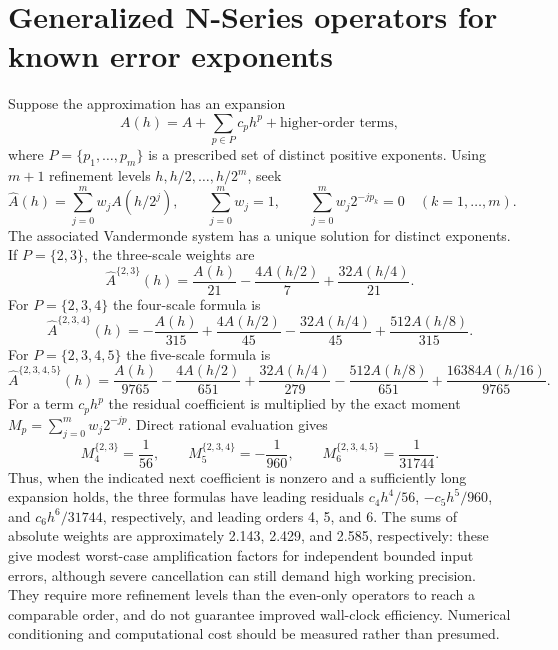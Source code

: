 \documentclass[11pt]{article}
\theoremstyle{remark}
\newcommand{\Ahat}{\widehat{A}}
\begin{document}
\section{Generalized N-Series operators for known error exponents}
Suppose the approximation has an expansion
\[
A(h)=A+\sum_{p\in P}c_ph^p+\text{higher-order terms},
\]
where $P=\{p_1,\dots,p_m\}$ is a prescribed set of distinct positive exponents. Using $m+1$
refinement levels $h,h/2,\dots,h/2^m$, seek
\begin{equation}\label{eq:gen}
\Ahat(h)=\sum_{j=0}^{m}w_jA(h/2^j),\qquad
\sum_{j=0}^{m}w_j=1,\qquad
\sum_{j=0}^{m}w_j2^{-jp_k}=0\quad(k=1,\dots,m).
\end{equation}
The associated Vandermonde system has a unique solution for distinct exponents. If
$P=\{2,3\}$, the three-scale weights are
\begin{equation}\label{eq:P23}
\Ahat^{\{2,3\}}(h)=\frac{A(h)}{21}-\frac{4A(h/2)}{7}+\frac{32A(h/4)}{21}.
\end{equation}
For $P=\{2,3,4\}$ the four-scale formula is
\begin{equation}\label{eq:P234}
\Ahat^{\{2,3,4\}}(h)=-\frac{A(h)}{315}+\frac{4A(h/2)}{45}-\frac{32A(h/4)}{45}+\frac{512A(h/8)}{315}.
\end{equation}
For $P=\{2,3,4,5\}$ the five-scale formula is
\begin{equation}\label{eq:P2345}
\Ahat^{\{2,3,4,5\}}(h)=\frac{A(h)}{9765}-\frac{4A(h/2)}{651}+\frac{32A(h/4)}{279}
-\frac{512A(h/8)}{651}+\frac{16384A(h/16)}{9765}.
\end{equation}
For a term $c_ph^p$ the residual coefficient is multiplied by the exact moment
$M_p=\sum_{j=0}^{m}w_j2^{-jp}$. Direct rational evaluation gives
\begin{equation}\label{eq:moments}
M^{\{2,3\}}_4=\frac1{56},\qquad M^{\{2,3,4\}}_5=-\frac1{960},\qquad M^{\{2,3,4,5\}}_6=\frac1{31744}.
\end{equation}
Thus, when the indicated next coefficient is nonzero and a sufficiently long expansion holds,
the three formulas have leading residuals $c_4h^4/56$, $-c_5h^5/960$, and $c_6h^6/31744$,
respectively, and leading orders 4, 5, and 6. The sums of absolute weights are approximately
2.143, 2.429, and 2.585, respectively: these give modest worst-case amplification factors for
independent bounded input errors, although severe cancellation can still demand high working
precision. They require more refinement levels than the even-only operators to reach a
comparable order, and do not guarantee improved wall-clock efficiency. Numerical conditioning
and computational cost should be measured rather than presumed.
\end{document}
